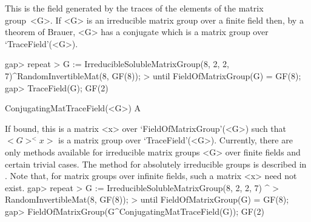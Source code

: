 This is the field generated by the traces of the elements of the matrix group~<G>. 
If <G> is an irreducible matrix group over a finite field then, by a theorem of Brauer, <G>
has a conjugate which is a matrix group over `TraceField'(<G>).

\beginexample
gap> repeat
>        G := IrreducibleSolubleMatrixGroup(8, 2, 2, 7)^RandomInvertibleMat(8, GF(8));
>    until FieldOfMatrixGroup(G) = GF(8);
gap> TraceField(G);
GF(2)
\endexample

\>ConjugatingMatTraceField(<G>) A

If bound, this is a matrix <x> over `FieldOfMatrixGroup'(<G>) such that
$<G>^<x>$ is a  matrix group over `TraceField'(<G>). Currently, there are
only methods available for irreducible matrix groups <G> over finite fields
and certain trivial cases.
The method for absolutely irreducible groups is described in
\cite{GH}. 
Note that, for matrix groups over infinite fields, such a matrix <x> 
need not exist.
\beginexample
gap> repeat
>       G := IrreducibleSolubleMatrixGroup(8, 2, 2, 7) ^ 
>                RandomInvertibleMat(8, GF(8));
>    until FieldOfMatrixGroup(G) = GF(8);
gap> FieldOfMatrixGroup(G^ConjugatingMatTraceField(G));
GF(2)
\endexample



